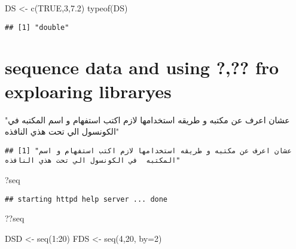 \documentclass[
]{article}
\newenvironment{Shaded}{\begin{snugshade}}{\end{snugshade}}
\newcommand{\AttributeTok}[1]{\textcolor[rgb]{0.77,0.63,0.00}{#1}}
\newcommand{\ConstantTok}[1]{\textcolor[rgb]{0.00,0.00,0.00}{#1}}
\newcommand{\DecValTok}[1]{\textcolor[rgb]{0.00,0.00,0.81}{#1}}
\newcommand{\FloatTok}[1]{\textcolor[rgb]{0.00,0.00,0.81}{#1}}
\newcommand{\FunctionTok}[1]{\textcolor[rgb]{0.00,0.00,0.00}{#1}}
\newcommand{\NormalTok}[1]{#1}
\newcommand{\OtherTok}[1]{\textcolor[rgb]{0.56,0.35,0.01}{#1}}
\newcommand{\SpecialCharTok}[1]{\textcolor[rgb]{0.00,0.00,0.00}{#1}}
\newcommand{\StringTok}[1]{\textcolor[rgb]{0.31,0.60,0.02}{#1}}
\begin{document}
\begin{Shaded}
\begin{Highlighting}[]
\NormalTok{DS }\OtherTok{\textless{}{-}} \FunctionTok{c}\NormalTok{(}\ConstantTok{TRUE}\NormalTok{,}\DecValTok{3}\NormalTok{,}\FloatTok{7.2}\NormalTok{)}
\FunctionTok{typeof}\NormalTok{(DS)}
\end{Highlighting}
\end{Shaded}

\begin{verbatim}
## [1] "double"
\end{verbatim}

\hypertarget{sequence-data-and-using-fro-exploaring-libraryes}{%
\section{sequence data and using ?,?? fro exploaring
libraryes}\label{sequence-data-and-using-fro-exploaring-libraryes}}

\begin{Shaded}
\begin{Highlighting}[]
\StringTok{"عشان اعرف عن مكتبه و طريقه استخدامها لازم اكتب استفهام و اسم المكتبه  في الكونسول الي تحت هذي النافذه"}
\end{Highlighting}
\end{Shaded}

\begin{verbatim}
## [1] "عشان اعرف عن مكتبه و طريقه استخدامها لازم اكتب استفهام و اسم المكتبه  في الكونسول الي تحت هذي النافذه"
\end{verbatim}

\begin{Shaded}
\begin{Highlighting}[]
\NormalTok{?seq}
\end{Highlighting}
\end{Shaded}

\begin{verbatim}
## starting httpd help server ... done
\end{verbatim}

\begin{Shaded}
\begin{Highlighting}[]
\NormalTok{??seq}


\NormalTok{DSD }\OtherTok{\textless{}{-}} \FunctionTok{seq}\NormalTok{(}\DecValTok{1}\SpecialCharTok{:}\DecValTok{20}\NormalTok{)}
\NormalTok{FDS }\OtherTok{\textless{}{-}} \FunctionTok{seq}\NormalTok{(}\DecValTok{4}\NormalTok{,}\DecValTok{20}\NormalTok{, }\AttributeTok{by=}\DecValTok{2}\NormalTok{)}
\end{Highlighting}
\end{Shaded}
\end{document}

